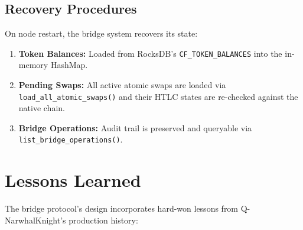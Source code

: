 \documentclass[11pt,a4paper]{article}
\begin{document}
\subsection{Recovery Procedures}

On node restart, the bridge system recovers its state:

\begin{enumerate}
    \item \textbf{Token Balances:} Loaded from RocksDB's \texttt{CF\_TOKEN\_BALANCES} into the in-memory HashMap.
    \item \textbf{Pending Swaps:} All active atomic swaps are loaded via \texttt{load\_all\_atomic\_swaps()} and their HTLC states are re-checked against the native chain.
    \item \textbf{Bridge Operations:} Audit trail is preserved and queryable via \texttt{list\_bridge\_operations()}.
\end{enumerate}

\section{Lessons Learned}
\label{sec:lessons}

The bridge protocol's design incorporates hard-won lessons from Q-NarwhalKnight's production history:
\end{document}
